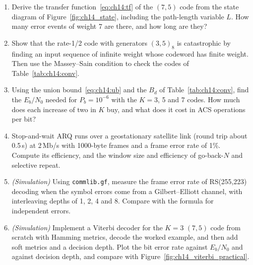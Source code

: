 \begin{enumerate}[label=\thechapter.\arabic*]
correct?
\item Derive the transfer function~\eqref{eq:ch14:tf} of the $(7,5)$ code from the state diagram of
Figure~\ref{fig:ch14_state}, including the path-length variable $L$. How many error events of weight 7 are
there, and how long are they?
\item Show that the rate-1/2 code with generators $(3,5)_8$ is catastrophic by finding an input sequence of
infinite weight whose codeword has finite weight. Then use the Massey--Sain condition to check the codes of
Table~\ref{tab:ch14:conv}.
\item Using the union bound~\eqref{eq:ch14:ub} and the $B_d$ of Table~\ref{tab:ch14:conv}, find the
$E_b/N_0$ needed for $P_b=10^{-6}$ with the $K=3$, 5 and 7 codes. How much does each increase of two in
$K$ buy, and what does it cost in ACS operations per bit?
\item Stop-and-wait ARQ runs over a geostationary satellite link (round trip about 0.5\,s) at 2\,Mb/s with
1000-byte frames and a frame error rate of 1\%. Compute its efficiency, and the window size and efficiency of
go-back-$N$ and selective repeat.
\item \emph{(Simulation)} Using \texttt{commlib.gf}, measure the frame error rate of RS(255,223) decoding when
the symbol errors come from a Gilbert--Elliott channel, with interleaving depths of 1, 2, 4 and 8. Compare with
the formula for independent errors.
\item \emph{(Simulation)} Implement a Viterbi decoder for the $K=3$ $(7,5)$ code from scratch with Hamming
metrics, decode the worked example, and then add soft metrics and a decision depth. Plot the bit error rate
against $E_b/N_0$ and against decision depth, and compare with Figure~\ref{fig:ch14_viterbi_practical}.
\end{enumerate}

